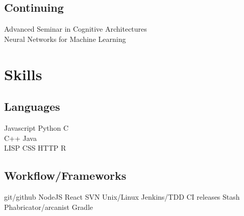 \documentclass[]{csaund_resume-openfont}
\begin{document}
\begin{minipage}[t]{0.30\textwidth}
\subsection{Continuing}
Advanced Seminar in Cognitive Architectures \\
Neural Networks for Machine Learning 


\section{Skills}
\subsection{Languages}
Javascript \textbullet{} Python \textbullet{} C \\
C++ \textbullet{} Java  \\
LISP \textbullet{} CSS \textbullet{} HTTP \textbullet{} R \\
\vspace{\topsep} %

\subsection{Workflow/Frameworks}
git/github \textbullet{} NodeJS  \textbullet{} React \textbullet{} SVN \textbullet{}  Unix/Linux \textbullet{} Jenkins/TDD \textbullet{} CI releases \textbullet{}
 Stash \textbullet{} Phabricator/arcanist \textbullet{} Gradle
\sectionsep

%
%

\end{minipage}
\hfill
\end{document}
